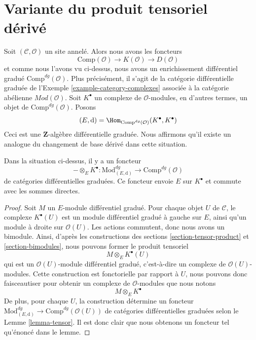 \section{Variante du produit tensoriel dérivé}
\label{section-variant-base-change}

\noindent
Soit $(\mathcal{C}, \mathcal{O})$ un site annelé. Alors nous avons les foncteurs
$$
\text{Comp}(\mathcal{O}) \to K(\mathcal{O}) \to D(\mathcal{O})
$$
et comme nous l'avons vu ci-dessus, nous avons un enrichissement différentiel gradué
$\text{Comp}^{dg}(\mathcal{O})$. Plus précisément, il s'agit de la catégorie
différentielle graduée de l'Exemple \ref{example-category-complexes} associée à la
catégorie abélienne $\textit{Mod}(\mathcal{O})$. Soit $K^\bullet$ un complexe de
$\mathcal{O}$-modules, en d'autres termes, un objet de
$\text{Comp}^{dg}(\mathcal{O})$. Posons
$$
(E, \text{d}) =
\Hom_{\text{Comp}^{dg}(\mathcal{O})}(K^\bullet, K^\bullet)
$$
Ceci est une $\mathbf{Z}$-algèbre différentielle graduée. Nous affirmons qu'il
existe un analogue du changement de base dérivé dans cette situation.

\begin{lemma}
\label{lemma-tensor-with-complex}
Dans la situation ci-dessus, il y a un foncteur
$$
- \otimes_E K^\bullet :
\text{Mod}^{dg}_{(E, \text{d})}
\longrightarrow
\text{Comp}^{dg}(\mathcal{O})
$$
de catégories différentielles graduées. Ce foncteur envoie $E$ sur $K^\bullet$
et commute avec les sommes directes.
\end{lemma}

\begin{proof}
Soit $M$ un $E$-module différentiel gradué. Pour chaque objet $U$ de
$\mathcal{C}$, le complexe $K^\bullet(U)$ est un module différentiel gradué à
gauche sur $E$, ainsi qu'un module à droite sur $\mathcal{O}(U)$. Les actions
commutent, donc nous avons un bimodule. Ainsi, d'après les constructions des
sections \ref{section-tensor-product} et \ref{section-bimodules}, nous pouvons
former le produit tensoriel
$$
M \otimes_E K^\bullet(U)
$$
qui est un $\mathcal{O}(U)$-module différentiel gradué, c’est-à-dire un complexe
de $\mathcal{O}(U)$-modules. Cette construction est fonctorielle par rapport à
$U$, nous pouvons donc faisceautiser pour obtenir un complexe de
$\mathcal{O}$-modules que nous notons
$$
M \otimes_E K^\bullet
$$
De plus, pour chaque $U$, la construction détermine un foncteur
$\text{Mod}^{dg}_{(E, \text{d})} \to \text{Comp}^{dg}(\mathcal{O}(U))$ de
catégories différentielles graduées selon le Lemme \ref{lemma-tensor}. Il est donc
clair que nous obtenons un foncteur tel qu'énoncé dans le lemme.
\end{proof}

